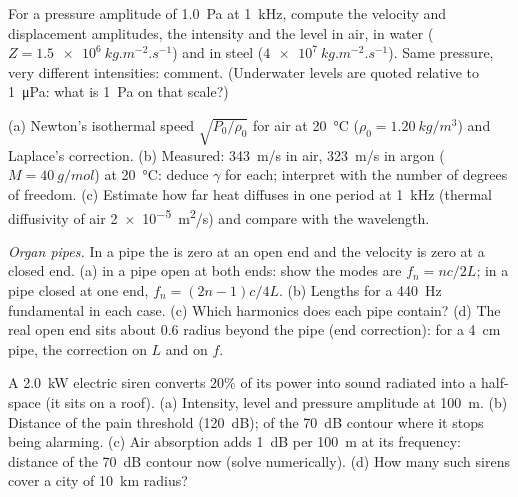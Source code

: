 \begin{exercise}[$\star\star$]\label{exo:b2:sound-waves:6}
For a pressure amplitude of \qty{1.0}{Pa} at \qty{1}{kHz}, compute the
velocity and displacement amplitudes, the intensity and the level in
air, in water ($Z = \qty{1.5e6}{kg.m^{-2}.s^{-1}}$) and in steel
($\qty{4e7}{kg.m^{-2}.s^{-1}}$). Same pressure, very different intensities:
comment. (Underwater levels are quoted relative to \qty{1}{\micro Pa}: what
is \qty{1}{Pa} on that scale?)
\end{exercise}

\begin{exercise}[$\star\star$]\label{exo:b2:sound-waves:7}
(a) Newton's isothermal speed $\sqrt{P_0/\rho_0}$ for air at
\qty{20}{\degreeCelsius} ($\rho_0 = \qty{1.20}{kg/m^3}$) and Laplace's correction.
(b) Measured: \qty{343}{m/s} in air, \qty{323}{m/s} in argon ($M = \qty{40}{g/mol}$)
at \qty{20}{\degreeCelsius}: deduce $\gamma$ for each; interpret with the
number of degrees of freedom. (c) Estimate how far heat diffuses in
one period at \qty{1}{kHz} (thermal diffusivity of air
\qty{2e-5}{m^2/s}) and compare with the wavelength.
\end{exercise}

\begin{exercise}[$\star\star$]\label{exo:b2:sound-waves:8}
\emph{Organ pipes.} In a pipe the  is zero at an open end
and the velocity is zero at a closed end. (a)  in a pipe
open at both ends: show the modes are $f_n = nc/2L$; in a pipe closed at
one end, $f_n = (2n - 1)c/4L$. (b) Lengths for a \qty{440}{Hz} fundamental
in each case. (c) Which harmonics does each pipe contain? (d) The real
open end sits about $0.6$ radius beyond the pipe (end correction): for
a \qty{4}{cm} pipe, the correction on $L$ and on $f$.
\end{exercise}

\begin{exercise}[$\star\star$]\label{exo:b2:sound-waves:9}
A \qty{2.0}{kW} electric siren converts $20\%$ of its power into sound
radiated into a half-space (it sits on a roof). (a) Intensity, level
and pressure amplitude at \qty{100}{m}. (b) Distance of the pain threshold
(\qty{120}{dB}); of the \qty{70}{dB} contour where it stops being alarming.
(c) Air absorption adds \qty{1}{dB} per \qty{100}{m} at its frequency:
distance of the \qty{70}{dB} contour now (solve numerically). (d) How many
such sirens cover a city of \qty{10}{km} radius?
\end{exercise}

